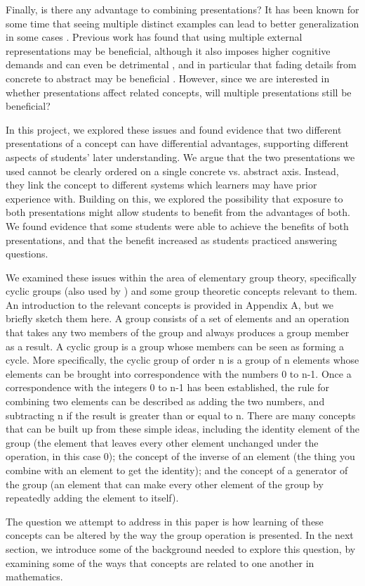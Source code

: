 \documentclass[man,10pt]{apa6}
\begin{document}
Finally, is there any advantage to combining presentations? It has been known for some time that seeing multiple distinct examples can lead to better generalization in some cases \cite{Gick1983}. Previous work has found that using multiple external representations may be beneficial, although it also imposes higher cognitive demands and can even be detrimental \cite{Ainsworth2006,Rau2016}, and in particular that fading details from concrete to abstract may be beneficial \cite{Goldstone2005,Fyfe2014}. However, since we are interested in whether presentations affect related concepts, will multiple presentations still be beneficial? \par 
In this project, we explored these issues and found evidence that two different presentations of a concept can have differential advantages, supporting different aspects of students' later understanding. We argue that the two presentations we used cannot be clearly ordered on a single concrete vs. abstract axis. Instead, they link the concept to different systems which learners may have prior experience with. Building on this, we explored the possibility that exposure to both presentations might allow students to benefit from the advantages of both. We found evidence that some students were able to achieve the benefits of both presentations, and that the benefit increased as students practiced answering questions. \par
We examined these issues within the area of elementary group theory, specifically cyclic groups (also used by ) and some group theoretic concepts relevant to them. An introduction to the relevant concepts is provided in Appendix A, but we briefly sketch them here. A group consists of a set of elements and an operation that takes any two members of the group and always produces a group member as a result. A cyclic group is a group whose members can be seen as forming a cycle. More specifically, the cyclic group of order n is a group of n elements whose elements can be brought into correspondence with the numbers 0 to n-1. Once a correspondence with the integers 0 to n-1 has been established, the rule for combining two elements can be described as adding the two numbers, and subtracting n if the result is greater than or equal to n. There are many concepts that can be built up from these simple ideas, including the identity element of the group (the element that leaves every other element unchanged under the operation, in this case 0); the concept of the inverse of an element (the thing you combine with an element to get the identity); and the concept of a generator of the group (an element that can make every other element of the group by repeatedly adding the element to itself). \par
The question we attempt to address in this paper is how learning of these concepts can be altered by the way the group operation is presented. In the next section, we introduce some of the background needed to explore this question, by examining some of the ways that concepts are related to one another in mathematics.
\end{document}
